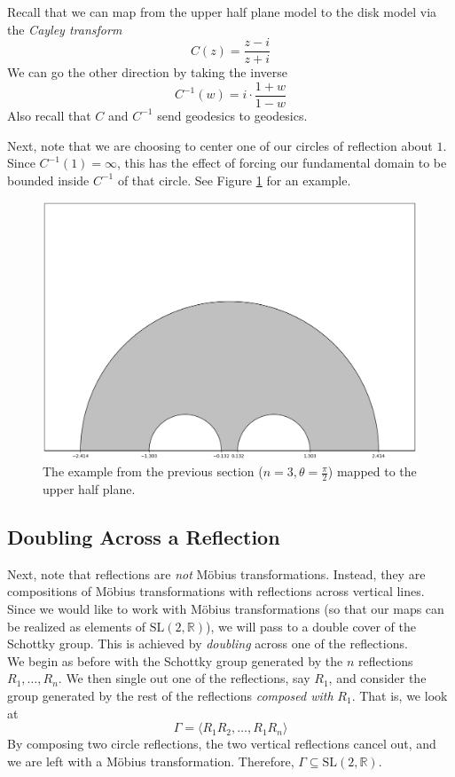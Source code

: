 \documentclass[]{article}
\begin{document}
Recall that we can map from the upper half plane model to the disk model via the \textit{Cayley transform}
$$
C(z) = \frac{z - i}{z + i}
$$
We can go the other direction by taking the inverse
$$
C^{-1}(w) = i\cdot\frac{1 + w}{1 - w}
$$
Also recall that $C$ and $C^{-1}$ send geodesics to geodesics.

Next, note that we are choosing to center one of our circles of reflection about $1$.
Since $C^{-1}(1) = \infty$, this has the effect of forcing our fundamental domain to be bounded inside $C^{-1}$ of that circle.
See Figure \ref{UHP_FD} for an example.

\begin{figure}[h]
	\centering
	\includegraphics[width=0.8\linewidth]{UHP_FD.png}
	\caption{The example from the previous section ($n = 3, \theta = \frac{\pi}{2}$) mapped to the upper half plane.}
	\label{UHP_FD}
\end{figure}

\subsection*{Doubling Across a Reflection}

Next, note that reflections are \textit{not} M\"obius transformations.
Instead, they are compositions of M\"obius transformations with reflections across vertical lines.
Since we would like to work with M\"obius transformations (so that our maps can be realized as elements of $\text{SL}(2, \mathbb{R})$), we will pass to a double cover of the Schottky group.
This is achieved by \textit{doubling} across one of the reflections.
\\

We begin as before with the Schottky group generated by the $n$ reflections $R_1, \dots, R_n$.
We then single out one of the reflections, say $R_1$, and consider the group generated by the rest of the reflections \textit{composed with} $R_1$.
That is, we look at
$$
\Gamma = \langle R_1R_2, \dots, R_1R_n \rangle
$$
By composing two circle reflections, the two vertical reflections cancel out, and we are left with a M\"obius transformation.
Therefore, $\Gamma \subseteq \text{SL}(2, \mathbb{R})$.
\\
\end{document}
